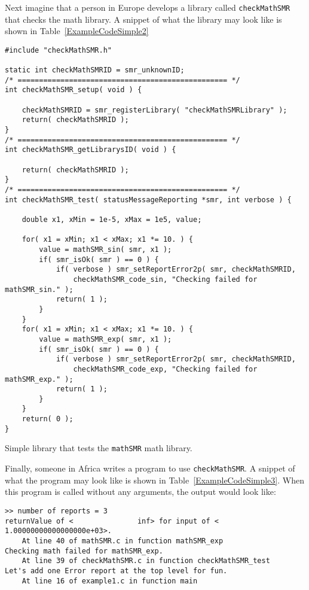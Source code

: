 \documentclass[11pt]{article}
\begin{document}
Next imagine that a person in Europe develops a library called \texttt{checkMathSMR} that checks the math library. 
A snippet of what the library may look like is shown in Table~\ref{ExampleCodeSimple2}

\begin{table}
\begin{verbatim}
#include "checkMathSMR.h"

static int checkMathSMRID = smr_unknownID;
/* ================================================= */
int checkMathSMR_setup( void ) {

    checkMathSMRID = smr_registerLibrary( "checkMathSMRLibrary" );
    return( checkMathSMRID );
}
/* ================================================= */
int checkMathSMR_getLibrarysID( void ) {

    return( checkMathSMRID );
}
/* ================================================= */
int checkMathSMR_test( statusMessageReporting *smr, int verbose ) {

    double x1, xMin = 1e-5, xMax = 1e5, value;

    for( x1 = xMin; x1 < xMax; x1 *= 10. ) {
        value = mathSMR_sin( smr, x1 );
        if( smr_isOk( smr ) == 0 ) {
            if( verbose ) smr_setReportError2p( smr, checkMathSMRID, 
                checkMathSMR_code_sin, "Checking failed for mathSMR_sin." );
            return( 1 );
        }
    }
    for( x1 = xMin; x1 < xMax; x1 *= 10. ) {
        value = mathSMR_exp( smr, x1 );
        if( smr_isOk( smr ) == 0 ) {
            if( verbose ) smr_setReportError2p( smr, checkMathSMRID, 
                checkMathSMR_code_exp, "Checking failed for mathSMR_exp." );
            return( 1 );
        }
    }
    return( 0 );
}
\end{verbatim}
\caption{Simple library that tests the \texttt{mathSMR} math library.} \label{ExampleCodeSimple2}
\end{table}

Finally, someone in Africa writes a program to use \texttt{checkMathSMR}.
A snippet of what the program may look like is shown in Table~\ref{ExampleCodeSimple3}.
When this program is called without any arguments, the output would look like:

\begin{verbatim}
>> number of reports = 3
returnValue of <               inf> for input of <  1.00000000000000000e+03>.
    At line 40 of mathSMR.c in function mathSMR_exp
Checking math failed for mathSMR_exp.
    At line 39 of checkMathSMR.c in function checkMathSMR_test
Let's add one Error report at the top level for fun.
    At line 16 of example1.c in function main
\end{verbatim}
\end{document}
